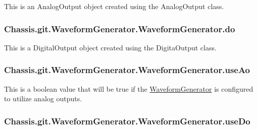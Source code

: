 This is an Analog\-Output object created using the Analog\-Output class. 

\hypertarget{class_chassis_8git_1_1_waveform_generator_1_1_waveform_generator_a46a8a04fef697158b2274fa12033a6e0}{
\subsubsection[{do}]{\setlength{\rightskip}{0pt plus 5cm}Chassis.\-git.\-Waveform\-Generator.\-Waveform\-Generator.\-do}}\label{class_chassis_8git_1_1_waveform_generator_1_1_waveform_generator_a46a8a04fef697158b2274fa12033a6e0}


This is a Digital\-Output object created using the Digita\-Output class. 

\hypertarget{class_chassis_8git_1_1_waveform_generator_1_1_waveform_generator_a914dc22840386507f16100c0c7028b7e}{
\subsubsection[{use\-Ao}]{\setlength{\rightskip}{0pt plus 5cm}Chassis.\-git.\-Waveform\-Generator.\-Waveform\-Generator.\-use\-Ao}}\label{class_chassis_8git_1_1_waveform_generator_1_1_waveform_generator_a914dc22840386507f16100c0c7028b7e}


This is a boolean value that will be true if the \hyperlink{class_chassis_8git_1_1_waveform_generator_1_1_waveform_generator}{Waveform\-Generator} is configured to utilize analog outputs. 

\hypertarget{class_chassis_8git_1_1_waveform_generator_1_1_waveform_generator_a94522148c84bc1c3af50f1b35d772e63}{
\subsubsection[{use\-Do}]{\setlength{\rightskip}{0pt plus 5cm}Chassis.\-git.\-Waveform\-Generator.\-Waveform\-Generator.\-use\-Do}}\label{class_chassis_8git_1_1_waveform_generator_1_1_waveform_generator_a94522148c84bc1c3af50f1b35d772e63}


